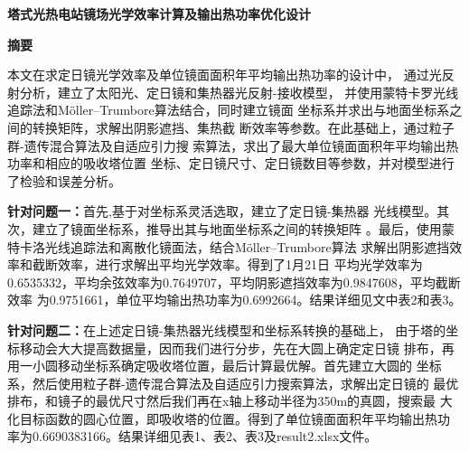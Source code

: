 \documentclass{数学建模}
\begin{document}
\renewcommand{\thesubsection}{\thesection.\arabic{subsection}}
\renewcommand{\thesubsubsection}{\thesubsection.\arabic{subsubsection}}










\songti {}
\begin{center}
    {\heiti {}\textbf{塔式光热电站镜场光学效率计算及输出热功率优化设计}}
\end{center}

\begin{center}
    {\heiti {}\textbf{摘要}}
\end{center}

本文在求定日镜光学效率及单位镜面面积年平均输出热功率的设计中，
通过光反射分析，建立了太阳光、定日镜和集热器光反射-接收模型，
并使用蒙特卡罗光线追踪法和Möller–Trumbore算法结合，同时建立镜面
坐标系并求出与地面坐标系之间的转换矩阵，求解出阴影遮挡、集热截
断效率等参数。在此基础上，通过粒子群-遗传混合算法及自适应引力搜
索算法，求出了最大单位镜面面积年平均输出热功率和相应的吸收塔位置
坐标、定日镜尺寸、定日镜数目等参数，并对模型进行了检验和误差分析。

\textbf{针对问题一：}首先,基于对坐标系灵活选取，建立了定日镜-集热器
光线模型。其次，建立了镜面坐标系，推导出其与地面坐标系之间的转换矩阵
。最后，使用蒙特卡洛光线追踪法和离散化镜面法，结合Möller–Trumbore算法
求解出阴影遮挡效率和截断效率，进行求解出平均光学效率。得到了1月21日
平均光学效率为0.6535332，平均余弦效率为0.7649707，平均阴影遮挡效率为0.9847608，平均截断效率
为0.9751661，单位平均输出热功率为0.6992664。结果详细见文中表2和表3。

\textbf{针对问题二：}在上述定日镜-集热器光线模型和坐标系转换的基础上，
由于塔的坐标移动会大大提高数据量，因而我们进行分步，先在大圆上确定定日镜
排布，再用一小圆移动坐标系确定吸收塔位置，最后计算最优解。首先建立大圆的
坐标系，然后使用粒子群-遗传混合算法及自适应引力搜索算法，求解出定日镜的
最优排布，和镜子的最优尺寸然后我们再在x轴上移动半径为350m的真圆，搜索最
大化目标函数的圆心位置，即吸收塔的位置。得到了单位镜面面积年平均输出热功
率为0.6690383166。结果详细见表1、表2、表3及result2.xlsx文件。
\end{document}
